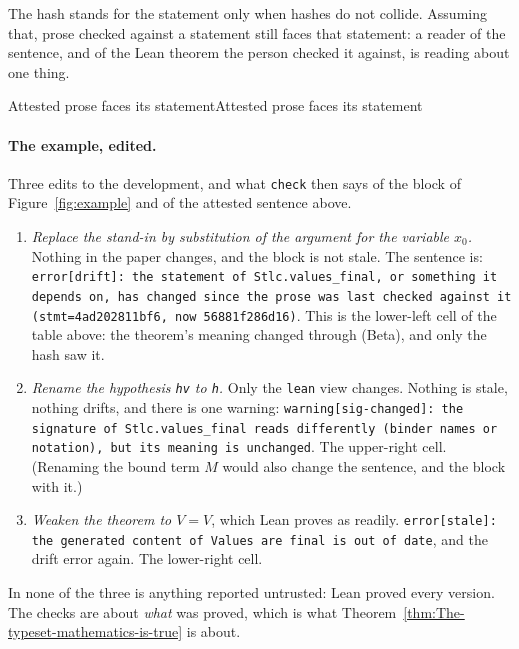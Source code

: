 \documentclass[acmsmall,screen,review,anonymous,nonacm]{acmart}
\begin{document}
The hash stands for the statement only when hashes do not collide. Assuming
that, prose checked against a statement still faces that statement: a
reader of the sentence, and of the Lean theorem the person checked it
against, is reading about one thing.

\begin{leantheorem}[sum=5RPDXXmi4l]{Attested prose faces its statement}{Attested prose faces its statement}
\label{thm:Attested-prose-faces-its-statement}
\end{leantheorem}

\paragraph{The example, edited.} Three edits to the development, and what
\verb|check| then says of the block of Figure~\ref{fig:example} and of the
attested sentence above.
\begin{enumerate}
\item \emph{Replace the stand-in by substitution of the argument for the
  variable $x_{0}$.} Nothing in the paper changes, and the block is not
  stale. The sentence is: \texttt{error[drift]: the statement of
  Stlc.values\_final, or something it depends on, has changed since the
  prose was last checked against it (stmt=4ad202811bf6, now 56881f286d16)}.
  This is the lower-left cell of the table above:
  the theorem's meaning changed through (Beta), and only the hash saw it.
\item \emph{Rename the hypothesis \texttt{hv} to \texttt{h}.} Only the
  \texttt{lean} view changes. Nothing is stale, nothing drifts, and there
  is one warning: \texttt{warning[sig-changed]: the signature of
  Stlc.values\_final reads differently (binder names or notation), but its
  meaning is unchanged}. The upper-right cell. (Renaming the bound term
  $M$ would also change the sentence, and the block with it.)
\item \emph{Weaken the theorem to $V = V$}, which Lean proves as readily.
  \texttt{error[stale]: the generated content of Values are final is out
  of date}, and the drift error again. The lower-right cell.
\end{enumerate}
In none of the three is anything reported untrusted: Lean proved every
version. The checks are about \emph{what} was proved, which is what
Theorem~\ref{thm:The-typeset-mathematics-is-true} is about.
\end{document}
